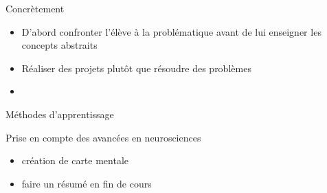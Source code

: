 \begin{frame}{Concrètement}
\begin{itemize}
  \item D'abord confronter l'élève à la problématique avant de lui enseigner les concepts abstraits
  \item Réaliser des projets plutôt que résoudre des problèmes
  \item 
\end{itemize}
\end{frame}

\begin{frame}{Méthodes d'apprentissage}
  \begin{block}{Prise en compte des avancées en neurosciences}
    \begin{itemize}
    \item création de carte mentale
    \item faire un résumé en fin de cours
    \end{itemize}

  \end{block}

\end{frame}